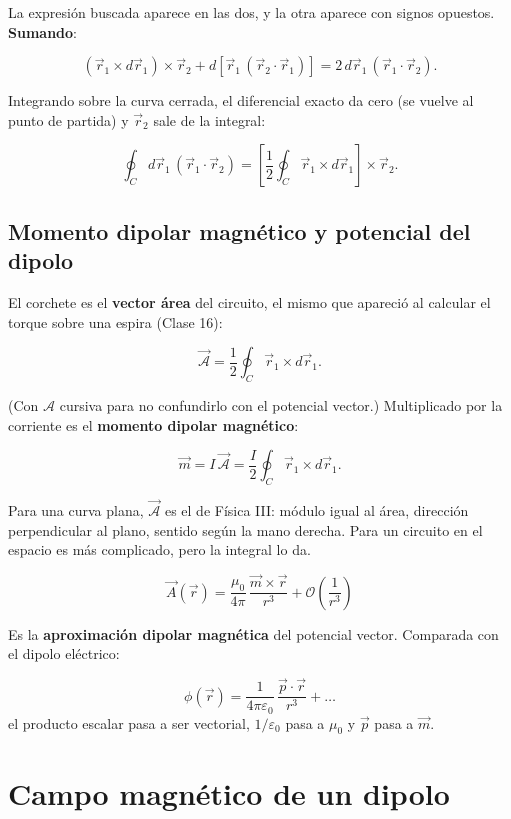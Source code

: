 \documentclass[12pt,a4paper]{article}
\begin{document}
La expresión buscada aparece en las dos, y la otra aparece con signos opuestos.
\textbf{Sumando}:

\[
(\vec r_1\times d\vec r_1)\times\vec r_2 + d\!\left[\vec r_1\,(\vec r_2\cdot\vec r_1)\right]
= 2\,d\vec r_1\,(\vec r_1\cdot\vec r_2).
\]

Integrando sobre la curva cerrada, el diferencial exacto da cero (se vuelve al
punto de partida) y $\vec r_2$ sale de la integral:

\[
\oint_C d\vec r_1\,(\vec r_1\cdot\vec r_2)
= \left[\frac12\oint_C \vec r_1\times d\vec r_1\right]\times\vec r_2 .
\]

\subsection{Momento dipolar magnético y potencial del dipolo}

El corchete es el \textbf{vector área} del circuito, el mismo que apareció al
calcular el torque sobre una espira (Clase 16):

\[
\vec{\mathcal A} = \frac12\oint_C \vec r_1\times d\vec r_1 .
\]

(Con $\mathcal A$ cursiva para no confundirlo con el potencial vector.)
Multiplicado por la corriente es el \textbf{momento dipolar magnético}:

\[
\vec m = I\,\vec{\mathcal A} = \frac{I}{2}\oint_C \vec r_1\times d\vec r_1 .
\]

Para una curva plana, $\vec{\mathcal A}$ es el de Física III: módulo igual al
área, dirección perpendicular al plano, sentido según la mano derecha. Para un
circuito en el espacio es más complicado, pero la integral lo da.

\begin{keybox}
\[
\boxed{\ \vec A(\vec r) = \frac{\mu_0}{4\pi}\,\frac{\vec m\times\vec r}{r^3}
+ \mathcal O\!\left(\frac{1}{r^3}\right)\ }
\]
\end{keybox}

Es la \textbf{aproximación dipolar magnética} del potencial vector. Comparada con el
dipolo eléctrico:

\[
\phi(\vec r) = \frac{1}{4\pi\varepsilon_0}\,\frac{\vec p\cdot\vec r}{r^3} + \dots
\]
el producto escalar pasa a ser vectorial, $1/\varepsilon_0$ pasa a $\mu_0$ y
$\vec p$ pasa a $\vec m$.

\section{Campo magnético de un dipolo}
\end{document}
